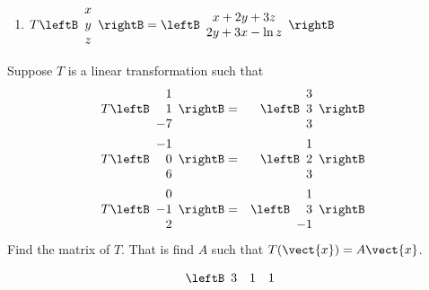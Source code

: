 \begin{enumialphparenastyle}
\begin{ex}
\begin{enumerate}
\item $T\leftB
\begin{array}{c}
x \\
y \\
z
\end{array}
\rightB =\leftB
\begin{array}{c}
x+2y+3z \\
2y+3x-\ln z
\end{array}
\rightB $
\end{enumerate}
\end{ex}


\begin{ex} Suppose $T$ is a linear transformation such that 
\begin{eqnarray*}
T\leftB
\begin{array}{r}
1 \\
1 \\
-7
\end{array}
\rightB &=&\leftB
\begin{array}{r}
3 \\
3 \\
3
\end{array}
\rightB \\
T\leftB
\begin{array}{r}
-1 \\
0 \\
6
\end{array}
\rightB &=&\leftB
\begin{array}{r}
1 \\
2 \\
3
\end{array}
\rightB \\
T\leftB
\begin{array}{r}
0 \\
-1 \\
2
\end{array}
\rightB &=&\leftB
\begin{array}{r}
1 \\
3 \\
-1
\end{array}
\rightB
\end{eqnarray*}
Find the matrix of $T$. That is find $A$ such that $T(\vect{x})=A\vect{x}$. \vspace{1mm}
\begin{sol}
\[
\leftB
\begin{array}{rrr}
3 & 1 & 1 \\

\end{array}\]
\end{sol}
\end{ex}
\end{enumialphparenastyle}
